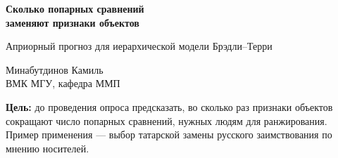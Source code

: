 \documentclass[aspectratio=169,10pt]{beamer}
\newcommand{\txt}{\fontsize{8.5}{10.2}\selectfont}
\newcommand{\key}[1]{{\color{accent}\bfseries #1}}
\begin{document}
\begin{frame}[plain]
\vspace{14mm}
{\fontsize{17}{21}\selectfont\bfseries\color{accent}
Сколько попарных сравнений\\ заменяют признаки объектов\par}
\vspace{2mm}
{\fontsize{11}{14}\selectfont\color{ink2}Априорный прогноз для иерархической модели Брэдли--Терри\par}
\vspace{9mm}
{\txt
Минабутдинов Камиль\\[1mm]
ВМК МГУ, кафедра ММП\par}
\vspace{9mm}
\begin{beamercolorbox}[wd=\linewidth,sep=2.5mm]{}
\colorbox{soft}{\parbox{0.96\linewidth}{\vspace{1.5mm}\txt
\key{Цель:} до проведения опроса предсказать, во сколько раз признаки объектов сокращают число попарных сравнений, нужных людям для ранжирования. Пример применения — выбор татарской замены русского заимствования по мнению носителей.\vspace{1.5mm}}}
\end{beamercolorbox}
\end{frame}
\end{document}
